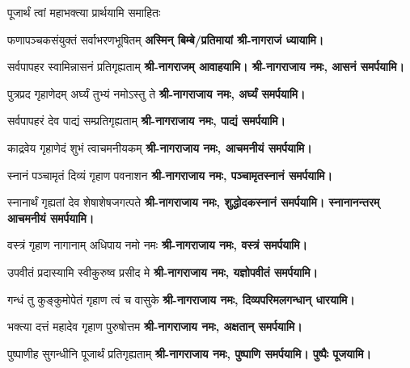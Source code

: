 \begingroup
\renewcommand{\devaName}{नागराज}

\endgroup







\renewcommand{\devAya}{श्री-नागराजाय नमः,}
\begin{center}


{पूजार्थं त्वां महाभक्त्या प्रार्थयामि समाहितः}

{फणापञ्चकसंयुक्तं सर्वाभरणभूषितम्}
\textbf{अस्मिन् बिम्बे/प्रतिमायां श्री-नागराजं ध्यायामि।}
\medskip

{सर्वपापहर स्वामिन्नासनं प्रतिगृह्यताम्}
\textbf{श्री-नागराजम् आवाहयामि। \devAya{} आसनं समर्पयामि।}
\medskip

{पुत्रप्रद गृहाणेदम् अर्घ्यं तुभ्यं नमोऽस्तु ते}
\textbf{\devAya{} अर्घ्यं समर्पयामि।}
\medskip

{सर्वपापहरं देव पाद्यं सम्प्रतिगृह्यताम्}
\textbf{\devAya{} पाद्यं समर्पयामि।}
\medskip

{काद्रवेय गृहाणेदं शुभं त्वाचमनीयकम्}
\textbf{\devAya{} आचमनीयं समर्पयामि।}
\medskip

{स्नानं पञ्चामृतं दिव्यं गृहाण पवनाशन}
\textbf{\devAya{} पञ्चामृतस्नानं समर्पयामि।}
\medskip

{स्नानार्थं गृह्यतां देव शेषाशेषजगत्पते}
\textbf{\devAya{} शुद्धोदकस्नानं समर्पयामि। स्नानानन्तरम् आचमनीयं समर्पयामि।}
\medskip

{वस्त्रं गृहाण नागानाम् अधिपाय नमो नमः}
\textbf{\devAya{} वस्त्रं समर्पयामि।}
\medskip

{उपवीतं प्रदास्यामि स्वीकुरुष्व प्रसीद मे}
\textbf{\devAya{} यज्ञोपवीतं समर्पयामि।}
\medskip

{गन्धं तु कुङ्कुमोपेतं गृहाण त्वं च वासुके}
\textbf{\devAya{} दिव्यपरिमलगन्धान् धारयामि।}
\medskip

{भक्त्या दत्तं महादेव गृहाण पुरुषोत्तम}
\textbf{\devAya{} अक्षतान् समर्पयामि।}
\medskip

{पुष्पाणीह सुगन्धीनि पूजार्थं प्रतिगृह्यताम्}
\textbf{\devAya{} पुष्पाणि समर्पयामि। पुष्पैः पूजयामि।}

\end{center}


